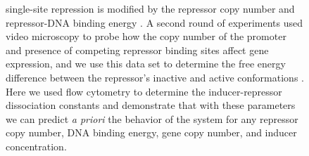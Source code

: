 \begin{figure}[h!]
{	single-site repression is modified by the repressor copy number and
	repressor-DNA binding energy \cite{Garcia2011}. A second round of experiments
	used video microscopy to probe how the copy number of the promoter and presence
	of competing repressor binding sites affect gene expression, and we use this
	data set to determine the free energy difference between the repressor’s
	inactive and active conformations \cite{Weinert2014}. Here we used flow
	cytometry to determine the inducer-repressor dissociation constants and
	demonstrate that with these parameters we can predict \textit{a priori} the
	behavior of the system for any repressor copy number, DNA binding energy, gene
	copy number, and inducer concentration.}
\label{figInductionCorepressionPhenotypicProperties}
\end{figure}

